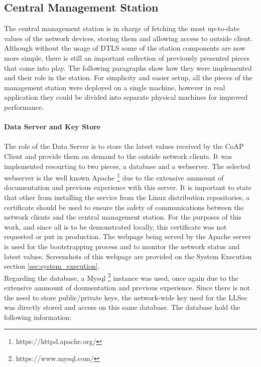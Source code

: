 \subsection{Central Management Station}
\label{backend_services}

The central management station is in charge of fetching the most up-to-date values of the network devices, storing them and allowing access to outside client. Although without the usage of \gls{DTLS} some of the station components are now more simple, there is still an important collection of previously presented pieces that come into play. The following paragraphs show how they were implemented and their role in the station. For simplicity and easier setup, all the pieces of the management station were deployed on a single machine, however in real application they could be divided into separate physical machines for improved performance.

\paragraph{\textbf{Data Server and Key Store}}
\paragraph{}
The role of the Data Server is to store the latest values received by the \gls{CoAP} Client and provide them on demand to the outside network clients. It was implemented resourting to two pieces, a database and a webserver. The selected webserver is the well known Apache \footnote{https://httpd.apache.org/} due to the extensive ammount of documentation and previous experience with this server. It is important to state that other from installing the service from the Linux distribution repositories, a certificate should be used to ensure the safety of communications between the network clients and the central management station. For the purposes of this work, and since all is to be demonstrated locally, this certificate was not requested or put in production. The webpage being served by the Apache server is used for the bootstrapping process and to monitor the network status and latest values. Screenshots of this webpage are provided on the System Execution section \ref{sec:system_execution}.\\
Regarding the database, a Mysql \footnote{https://www.mysql.com/} instance was used, once again due to the extensive ammount of doumentation and previous experience. Since there is not the need to store public/private keys, the network-wide key used for the \gls{LLSec} was directly stored and access on this same database. The database hold the following information:

